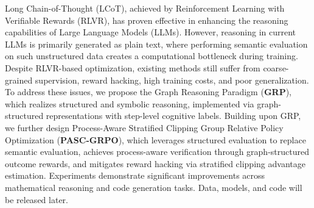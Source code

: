 
Long Chain-of-Thought (LCoT), achieved by Reinforcement Learning with Verifiable Rewards (RLVR), has proven effective in enhancing the reasoning capabilities of Large Language Models (LLMs).
However, reasoning in current LLMs is primarily generated as plain text, where performing semantic evaluation on such unstructured data creates a computational bottleneck during training.
Despite RLVR-based optimization, existing methods still suffer from coarse-grained supervision, reward hacking, high training costs, and poor generalization.
To address these issues, we propose the Graph Reasoning Paradigm (\textbf{GRP}), which realizes structured and symbolic reasoning, implemented via graph-structured representations with step-level cognitive labels. 
Building upon GRP, we further design Process-Aware Stratified Clipping Group Relative Policy Optimization (\textbf{PASC-GRPO}), which leverages structured evaluation to replace semantic evaluation, achieves process-aware verification through graph-structured outcome rewards, and mitigates reward hacking via stratified clipping advantage estimation.
Experiments demonstrate significant improvements across mathematical reasoning and code generation tasks. Data, models, and code will be released later.

